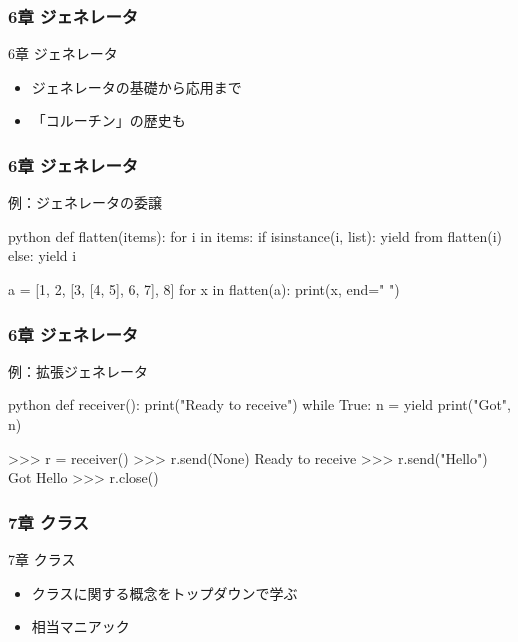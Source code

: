 \documentclass[aspectratio=169,dvipdfmx,12pt,notheorems]{beamer}
\theoremstyle{definition}
\begin{document}
\begin{frame}\frametitle{6章 ジェネレータ}

\begin{block}{6章 ジェネレータ}
\begin{itemize}
\item ジェネレータの基礎から応用まで
\item 「コルーチン」の歴史も
\end{itemize}
\end{block}

\end{frame}

\begin{frame}[fragile]\frametitle{6章 ジェネレータ}

\begin{exampleblock}{例：ジェネレータの委譲}
\begin{pygments}{python}    
def flatten(items):
    for i in items:
        if isinstance(i, list):
            yield from flatten(i)
        else:
            yield i

a = [1, 2, [3, [4, 5], 6, 7], 8]
for x in flatten(a):
    print(x, end=" ")
\end{pygments}
\end{exampleblock}

\end{frame}

\begin{frame}[fragile]\frametitle{6章 ジェネレータ}

\begin{exampleblock}{例：拡張ジェネレータ}
\begin{pygments}{python}    
def receiver():
    print("Ready to receive")
    while True:
        n = yield
        print("Got", n)

>>> r = receiver()
>>> r.send(None)
Ready to receive
>>> r.send("Hello")
Got Hello
>>> r.close()
\end{pygments}
\end{exampleblock}

\end{frame}

\begin{frame}\frametitle{7章 クラス}

\begin{block}{7章 クラス}
\begin{itemize}
\item クラスに関する概念をトップダウンで学ぶ
\item 相当マニアック
\end{itemize}
\end{block}

\end{frame}
\end{document}
